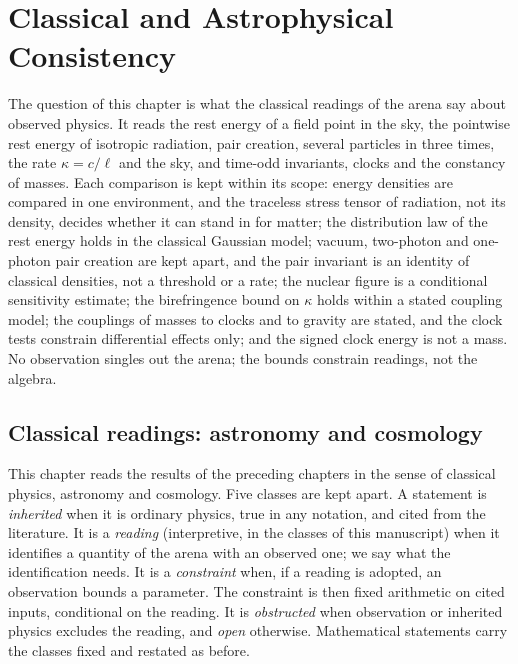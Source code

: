 \chapter{Classical and Astrophysical Consistency}
\label{ch:ch10_classical}

The question of this chapter is what the classical readings of the arena say about observed physics. It reads the rest energy
of a field point in the sky, the pointwise rest energy of isotropic radiation, pair creation, several particles in three times, the rate
$\kappa=c/\ell$ and the sky, and time-odd invariants, clocks and the constancy of masses. Each comparison is kept within its scope: energy
densities are compared in one environment, and the traceless stress tensor of radiation, not its density, decides whether it can stand in for
matter; the distribution law of the rest energy holds in the classical Gaussian model; vacuum, two-photon and one-photon pair creation are kept
apart, and the pair invariant is an identity of classical densities, not a threshold or a rate; the nuclear figure is a conditional sensitivity
estimate; the birefringence bound on $\kappa$ holds within a stated coupling model; the couplings of masses to clocks and to gravity are stated,
and the clock tests constrain differential effects only; and the signed clock energy is not a mass. No observation singles out the arena; the
bounds constrain readings, not the algebra.


\section{Classical readings: astronomy and cosmology}
\label{e7:sec:main}

This chapter reads the results of the preceding chapters in the sense of classical physics, astronomy and cosmology. Five
classes are kept apart. A statement is \emph{inherited} when it is ordinary physics, true in any notation, and cited from the literature. It is
a \emph{reading} (interpretive, in the classes of this manuscript) when it identifies a quantity of the arena with an observed one; we say what the
identification needs. It is a \emph{constraint} when, if a reading is adopted, an observation bounds a parameter. The constraint is then fixed
arithmetic on cited inputs, conditional on the reading. It is \emph{obstructed} when observation or inherited physics excludes the reading, and
\emph{open} otherwise. Mathematical statements carry the classes fixed and restated as before.

